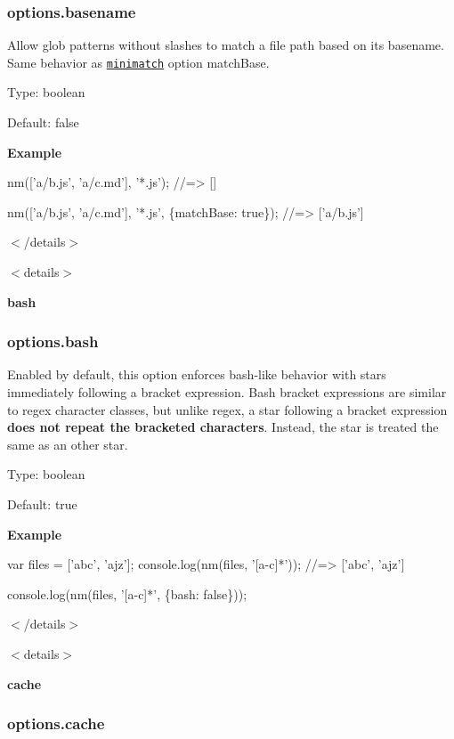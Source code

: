 \subsubsection*{options.\+basename}

Allow glob patterns without slashes to match a file path based on its basename. Same behavior as \href{https://github.com/isaacs/minimatch}{\tt minimatch} option {\ttfamily match\+Base}.

Type\+: {\ttfamily boolean}

Default\+: {\ttfamily false}

{\bfseries Example}


\begin{DoxyCode}
nm(['a/b.js', 'a/c.md'], '*.js');
//=> []

nm(['a/b.js', 'a/c.md'], '*.js', \{matchBase: true\});
//=> ['a/b.js']
\end{DoxyCode}


$<$/details$>$

$<$details$>$ 

{\bfseries bash}

\subsubsection*{options.\+bash}

Enabled by default, this option enforces bash-\/like behavior with stars immediately following a bracket expression. Bash bracket expressions are similar to regex character classes, but unlike regex, a star following a bracket expression {\bfseries does not repeat the bracketed characters}. Instead, the star is treated the same as an other star.

Type\+: {\ttfamily boolean}

Default\+: {\ttfamily true}

{\bfseries Example}


\begin{DoxyCode}
var files = ['abc', 'ajz'];
console.log(nm(files, '[a-c]*'));
//=> ['abc', 'ajz']

console.log(nm(files, '[a-c]*', \{bash: false\}));
\end{DoxyCode}


$<$/details$>$

$<$details$>$ 

{\bfseries cache}

\subsubsection*{options.\+cache}

